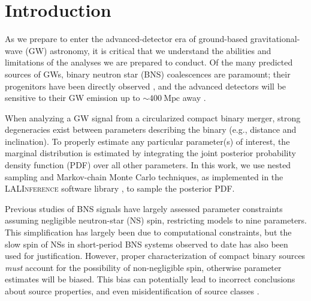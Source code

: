 \section{Introduction}

As we prepare to enter the advanced-detector era of ground-based gravitational-wave (GW) astronomy, it is critical that we understand the abilities and limitations of the analyses we are prepared to conduct. Of the many predicted sources of GWs, binary neutron star (BNS) coalescences are paramount; their progenitors have been directly observed \cite{Lorimer_2008}, and the advanced detectors will be sensitive to their GW emission up to $\sim 400~\mathrm{Mpc}$ away \citep{2013arXiv1304.0670L}.

When analyzing a GW signal from a circularized compact binary merger, strong degeneracies exist between parameters describing the binary (e.g., distance and inclination). To properly estimate any particular parameter(s) of interest, the marginal distribution is estimated by integrating the joint posterior probability density function (PDF) over all other parameters. In this work, we use nested sampling \citep{Veitch_2010} and Markov-chain Monte Carlo \citep{Christensen_2003,R_ver_2006,van_der_Sluys_2008} techniques, as implemented in the \textsc{LALInference} software library \cite{Veitch_2014}, to sample the posterior PDF.

Previous studies of BNS signals have largely assessed parameter constraints assuming negligible neutron-star (NS) spin, restricting models to nine parameters. This simplification has largely been due to computational constraints, but the slow spin of NSs in short-period BNS systems observed to date \citep[e.g.,][]{Mandel_2010} has also been used for justification. However, proper characterization of compact binary sources \emph{must} account for the possibility of non-negligible spin, otherwise parameter estimates will be biased.  This bias can potentially lead to incorrect conclusions about source properties, and even misidentification of source classes \citep{Buonanno_2009,Berry_2014}.

